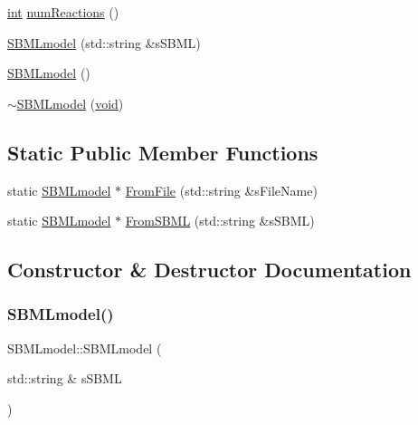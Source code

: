 \begin{DoxyCompactItemize}
\item 
\hyperlink{lp__lib_8h_adeb9ec6400320e4923ac9d836d509ddb}{int} \hyperlink{class_l_i_b___s_t_r_u_c_t_u_r_a_l_1_1_s_b_m_lmodel_abe88629d5ee1763dcc91e8a6a7adcdde}{num\+Reactions} ()
\item 
\hyperlink{class_l_i_b___s_t_r_u_c_t_u_r_a_l_1_1_s_b_m_lmodel_afe41f59a93bf19957c39075cc4231633}{S\+B\+M\+Lmodel} (std\+::string \&s\+S\+B\+ML)
\item 
\hyperlink{class_l_i_b___s_t_r_u_c_t_u_r_a_l_1_1_s_b_m_lmodel_aac64e9b05b1936f5685763ca115d3966}{S\+B\+M\+Lmodel} ()
\item 
\hyperlink{class_l_i_b___s_t_r_u_c_t_u_r_a_l_1_1_s_b_m_lmodel_a5a18e1a4b02f6a491b8fad9d8b9ac05a}{$\sim$\+S\+B\+M\+Lmodel} (\hyperlink{lp__lib_8h_ac7828c7b2b31d2e11af17bdb6289c5d9}{void})
\end{DoxyCompactItemize}
\subsection*{Static Public Member Functions}
\begin{DoxyCompactItemize}
\item 
static \hyperlink{class_l_i_b___s_t_r_u_c_t_u_r_a_l_1_1_s_b_m_lmodel}{S\+B\+M\+Lmodel} $\ast$ \hyperlink{class_l_i_b___s_t_r_u_c_t_u_r_a_l_1_1_s_b_m_lmodel_a52cd7e70ccb4993050ccd956a441cad7}{From\+File} (std\+::string \&s\+File\+Name)
\item 
static \hyperlink{class_l_i_b___s_t_r_u_c_t_u_r_a_l_1_1_s_b_m_lmodel}{S\+B\+M\+Lmodel} $\ast$ \hyperlink{class_l_i_b___s_t_r_u_c_t_u_r_a_l_1_1_s_b_m_lmodel_a8c74e88d1da838e18832c63c87c2aaf3}{From\+S\+B\+ML} (std\+::string \&s\+S\+B\+ML)
\end{DoxyCompactItemize}


\subsection{Constructor \& Destructor Documentation}
\mbox{\label{class_l_i_b___s_t_r_u_c_t_u_r_a_l_1_1_s_b_m_lmodel_afe41f59a93bf19957c39075cc4231633}} 
\subsubsection{\texorpdfstring{S\+B\+M\+Lmodel()}{SBMLmodel()}\hspace{0.1cm}{\footnotesize\ttfamily [1/2]}}
{\footnotesize\ttfamily S\+B\+M\+Lmodel\+::\+S\+B\+M\+Lmodel (\begin{DoxyParamCaption}\item[{std\+::string \&}]{s\+S\+B\+ML }\end{DoxyParamCaption})}

